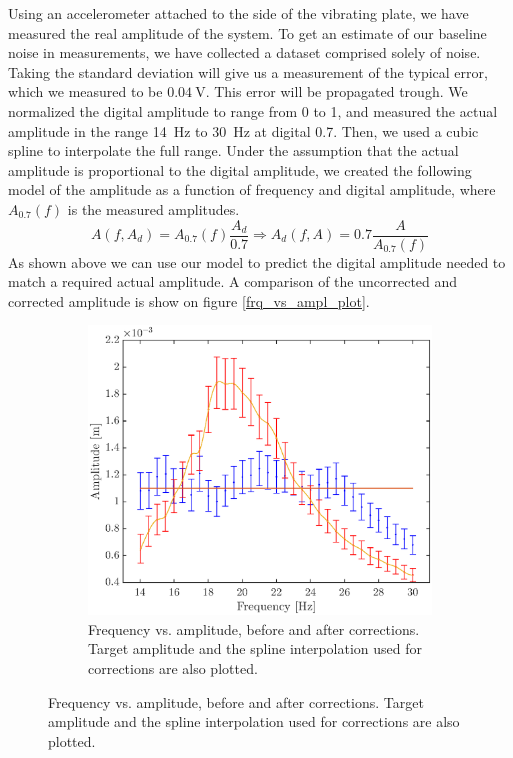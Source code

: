 \documentclass[12pt,oneside,a4paper]{article}
\numberwithin{equation}{section}
\begin{document}
{{{{Using an accelerometer attached to the side of the vibrating plate, we have measured the real amplitude of the system. To get an estimate of our baseline noise in measurements, we have collected a dataset comprised solely of noise. Taking the standard deviation will give us a measurement of the typical error, which we measured to be $\SI{0.04}{\volt}$. This error will be propagated trough. We normalized the digital amplitude to range from 0 to 1, and measured the actual amplitude in the range \SI{14}{Hz} to \SI{30}{Hz} at digital 0.7. Then, we used a cubic spline to interpolate the full range. Under the assumption that the actual amplitude is proportional to the digital amplitude, we created the following model of the amplitude as a function of frequency and digital amplitude, where $A_{0.7}(f)$ is the measured amplitudes.
\begin{equation}
	A(f,A_{d}) = A_{0.7}(f)\frac{A_{d}}{0.7} \Rightarrow A_d(f,A) = 0.7\frac{A}{A_{0.7}(f)}
	\label{ampl_model}
\end{equation}
As shown above we can use our model to predict the digital amplitude needed to match a required actual amplitude. A comparison of the uncorrected and corrected amplitude is show on figure \ref{frq_vs_ampl_plot}.
\begin{figure}[h]
	\centering
	\begin{subfigure}[t]{0.49\textwidth}
		\centering
		\includegraphics[width=\textwidth]{amplcorr2.eps} 
		\caption{Frequency vs. amplitude, before and after corrections. Target amplitude and the spline interpolation used for corrections are also plotted.}

\end{subfigure}
\end{figure}}}}}
\end{document}
